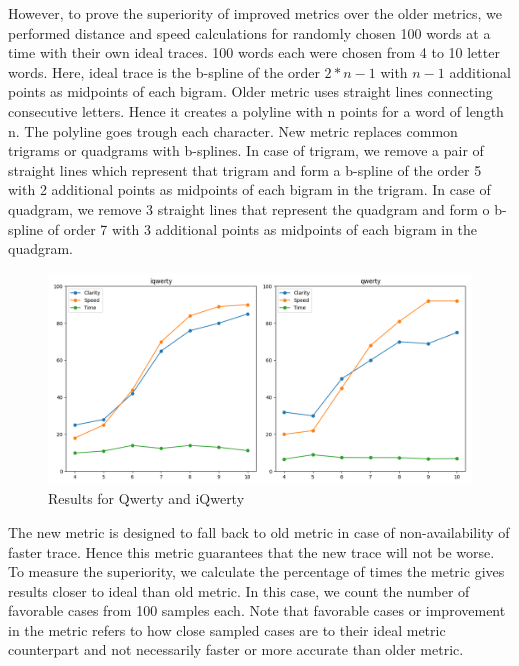\documentclass[MTech]{iitmdiss}
\begin{document}
However, to prove the superiority of improved metrics over the older metrics, we performed distance and speed calculations for randomly chosen 100 words at a time with their own ideal traces. 100 words each were chosen from 4 to 10 letter words. Here, ideal trace is the b-spline of the order $2*n-1$ with $n-1$ additional points as midpoints of each bigram. Older metric uses straight lines connecting consecutive letters. Hence it creates a polyline with n points for a word of length n. The polyline goes trough each character. New metric replaces common trigrams or quadgrams with b-splines. In case of trigram, we remove a pair of straight lines which represent that trigram and form a b-spline of the order 5 with 2 additional points as midpoints of each bigram in the trigram. In case of quadgram, we remove 3 straight lines that represent the quadgram and form o b-spline of order 7 with 3 additional points as midpoints of each bigram in the quadgram. 


\begin{figure}[h!] 
	\centering
	\includegraphics[scale=0.5]{Images/result}
	\caption{Results for Qwerty and iQwerty}
	\label{fig:results}
\end{figure}


The new metric is designed to fall back to old metric in case of non-availability of faster trace. Hence this metric guarantees that the new trace will not be worse. To measure the superiority, we calculate the percentage of times the metric gives results closer to ideal than old metric. In this case, we count the number of favorable cases from 100 samples each. Note that favorable cases or improvement in the metric refers to how close sampled cases are to their ideal metric counterpart and not necessarily faster or more accurate than older metric.
\end{document}
